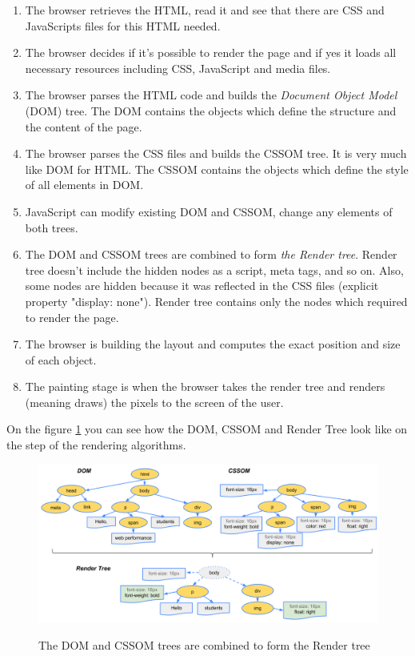 \begin{enumerate}
    \item The browser retrieves the HTML, read it and see that there are CSS and JavaScripts files for this HTML needed.
    \item The browser decides if it's possible to render the page and if yes it loads all necessary resources including CSS, JavaScript and media files.
    \item The browser parses the HTML code and builds the \textit{Document Object Model} (DOM) tree. The DOM contains the objects which define the structure and the content of the page.
    \item The browser parses the CSS files and builds the CSSOM tree. It is very much like DOM for HTML. The CSSOM contains the objects which define the style of all elements in DOM.
    \item JavaScript can modify existing DOM and CSSOM, change any elements of both trees.
    \item The DOM and CSSOM trees are combined to form \textit{the Render tree}. Render tree doesn't include the hidden nodes as a script, meta tags, and so on. Also, some nodes are hidden because it was reflected in the CSS files (explicit property "display: none"). Render tree contains only the nodes which required to render the page.
    \item The browser is building the layout and computes the exact position and size of each object.
    \item The painting stage is when the browser takes the render tree and renders (meaning draws) the pixels to the screen of the user. 
\end{enumerate}

On the figure \ref{fig:domcsstree} you can see how the DOM, CSSOM and Render Tree look like on the  step of the rendering algorithms.\\

\begin{figure}[h]
\begin{center}
\includegraphics[width=1.0\textwidth]{figures02/render-tree-construction}
\caption{The DOM and CSSOM trees are combined to form the Render tree}
\label{fig:domcsstree}
\end{center}
\end{figure}

